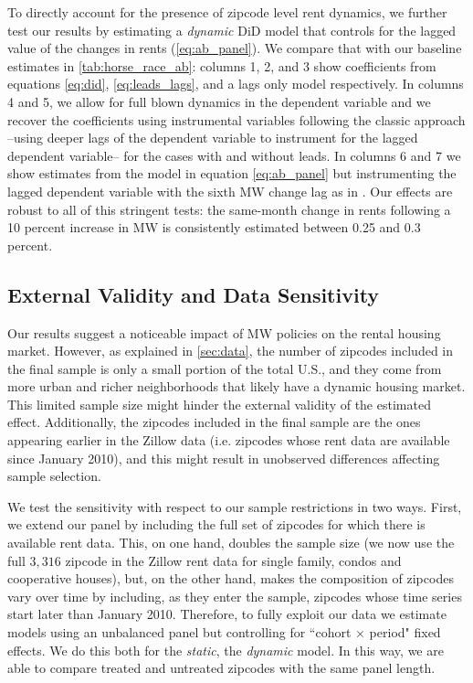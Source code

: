 To directly account for the presence of zipcode level rent dynamics, we further test our results by 
estimating a \textit{dynamic} DiD model that controls for the lagged value of the changes in rents 
(\autoref{eq:ab_panel}). We compare that with our baseline estimates in 
\autoref{tab:horse_race_ab}: columns 1, 2, and 3 show coefficients from equations \eqref{eq:did}, 
\eqref{eq:leads_lags}, and a lags only model respectively. In columns 4 and 5, we allow for full blown 
dynamics in the dependent variable and we recover the coefficients using instrumental variables 
following the classic \textcite{ArellanoBond1991} approach --using deeper lags of the dependent 
variable to instrument for the lagged dependent variable-- for the cases with and without leads. 
In columns 6 and 7 we show estimates from the model in equation \ref{eq:ab_panel} but instrumenting 
the lagged dependent variable with the sixth MW change lag as in \textcite{MeerWest2016}. Our 
effects are robust to all of this stringent tests: the same-month change in rents following a 10 
percent increase in MW is consistently estimated between 0.25 and 0.3 percent. 


\subsection{External Validity and Data Sensitivity}\label{sec:sample_rest}

Our results suggest a noticeable impact of MW policies on the rental housing market. However, as 
explained in \autoref{sec:data}, the number of zipcodes included in the final sample is only a 
small portion of the total U.S., and they come from more urban and richer neighborhoods that likely 
have a dynamic housing market. This limited sample size might hinder the external validity of the 
estimated effect. Additionally, the zipcodes included in the final sample are the ones appearing 
earlier in the Zillow data (i.e. zipcodes whose rent data are available since January 2010), and 
this might result in unobserved differences affecting sample selection.

We test the sensitivity with respect to our sample restrictions in two ways. First, we extend our 
panel by including the full set of zipcodes for which there is available rent data. This, on one 
hand, doubles the sample size (we now use the full $3,316$ zipcode in the Zillow rent data for 
single family, condos and cooperative houses), but, on the other hand, makes the composition of 
zipcodes vary over time by including, as they enter the sample, zipcodes whose time series start 
later than January 2010. Therefore, to fully exploit our data we estimate models using an unbalanced 
panel but controlling for ``cohort $\times$ period" fixed effects. We do this both for the \textit{static}, 
the \textit{dynamic} model. In this way, 
we are able to compare treated and untreated zipcodes with the same panel length.

